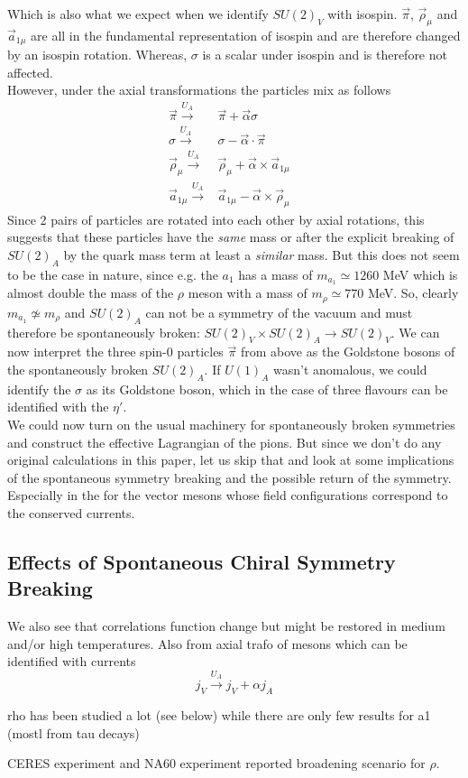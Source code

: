 Which is also what we expect when we identify $SU(2)_V$ with isospin. $\vec{\pi}$, $\vec{\rho}_{\mu}$ and $\vec{a}_{1 \mu}$ are all in the fundamental representation of isospin and are therefore changed by an isospin rotation. Whereas, $\sigma$ is a scalar under isospin and is therefore not affected. \\
However, under the axial transformations the particles mix as follows
\begin{align}
\vec{\pi} \overset{U_A}{\longrightarrow} & \vec{\pi} + \vec{\alpha} \sigma & \\
\sigma \overset{U_A}{\longrightarrow} & \sigma - \vec{\alpha} \cdot \vec{\pi} & \\
\vec{\rho}_{\mu} \overset{U_A}{\longrightarrow} & \vec{\rho}_{\mu} + \vec{\alpha} \times \vec{a}_{1 \mu} & \\
\vec{a}_{1 \mu} \overset{U_A}{\longrightarrow} & \vec{a}_{1 \mu} - \vec{\alpha} \times \vec{\rho}_{\mu}
\end{align}
Since 2 pairs of particles are rotated into each other by axial rotations, this suggests that these particles have the \textit{same} mass or after the explicit breaking of $SU(2)_A$ by the quark mass term at least a \textit{similar} mass. But this does not seem to be the case in nature, since e.g. the $a_1$ has a mass of $m_{a_1} \simeq 1260$ MeV which is almost double the mass of the $\rho$ meson with a mass of $m_{\rho} \simeq 770$ MeV. 
So, clearly $m_{a_1} \not\simeq m_{\rho}$ and $SU(2)_A$ can not be a symmetry of the vacuum and must therefore be spontaneously broken: $SU(2)_V \times SU(2)_A \rightarrow SU(2)_V$. We can now interpret the three spin-0 particles $\vec{\pi}$ from above as the Goldstone bosons of the spontaneously broken $SU(2)_A$. If $U(1)_A$ wasn't anomalous, we could identify the $\sigma$ as its Goldstone boson, which in the case of three flavours can be identified with the $\eta'$. \\
We could now turn on the usual machinery for spontaneously broken symmetries and construct the effective Lagrangian of the pions. But since we don't do any original calculations in this paper, let us skip that and look at some implications of the spontaneous symmetry breaking and the possible return of the symmetry. Especially in the for the vector mesons whose field configurations correspond to the conserved currents.

\subsection{Effects of Spontaneous Chiral Symmetry Breaking}

We also see that \cite{ChiPart} correlations function change but might be restored in medium and/or high temperatures. Also from axial trafo of mesons which can be identified with currents
\begin{equation}
j_V \overset{U_A}{\longrightarrow} j_V + \alpha j_A
\end{equation}

rho has been studied a lot (see below) while there are only few results for a1 (mostl from tau decays)

CERES experiment \cite{CERESrho} and NA60 experiment \cite{NA60rho} reported broadening scenario for $\rho$.